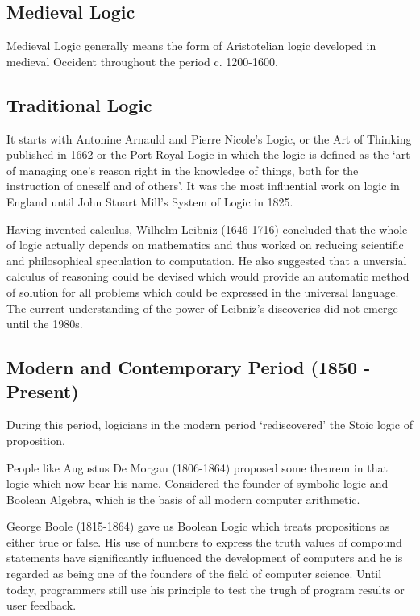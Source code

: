 \documentclass[]{book}
\theoremstyle{definition}
\theoremstyle{definition}
\theoremstyle{definition}
\theoremstyle{remark}
\begin{document}
\subsection{Medieval Logic}\label{medieval-logic}

Medieval Logic generally means the form of Aristotelian logic developed
in medieval Occident throughout the period c. 1200-1600.

\subsection{Traditional Logic}\label{traditional-logic}

It starts with Antonine Arnauld and Pierre Nicole's Logic, or the Art of
Thinking published in 1662 or the Port Royal Logic in which the logic is
defined as the `art of managing one's reason right in the knowledge of
things, both for the instruction of oneself and of others'. It was the
most influential work on logic in England until John Stuart Mill's
System of Logic in 1825.

Having invented calculus, Wilhelm Leibniz (1646-1716) concluded that the
whole of logic actually depends on mathematics and thus worked on
reducing scientific and philosophical speculation to computation. He
also suggested that a unversial calculus of reasoning could be devised
which would provide an automatic method of solution for all problems
which could be expressed in the universal language. The current
understanding of the power of Leibniz's discoveries did not emerge until
the 1980s.

\subsection{Modern and Contemporary Period (1850 -
Present)}\label{modern-and-contemporary-period-1850---present}

During this period, logicians in the modern period `rediscovered' the
Stoic logic of proposition.

People like Augustus De Morgan (1806-1864) proposed some theorem in that
logic which now bear his name. Considered the founder of symbolic logic
and Boolean Algebra, which is the basis of all modern computer
arithmetic.

George Boole (1815-1864) gave us Boolean Logic which treats propositions
as either true or false. His use of numbers to express the truth values
of compound statements have significantly influenced the development of
computers and he is regarded as being one of the founders of the field
of computer science. Until today, programmers still use his principle to
test the trugh of program results or user feedback.
\end{document}
